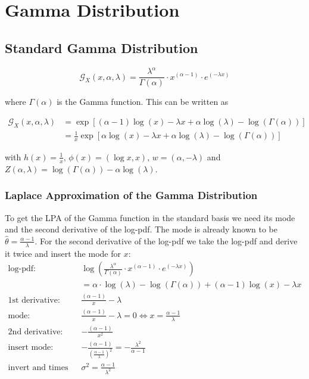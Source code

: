 \section{Gamma Distribution}

\subsection{Standard Gamma Distribution}

\begin{equation}
	\mathcal{G}_X(x, \alpha, \lambda) = \frac{\lambda^\alpha}{\Gamma(\alpha)} \cdot x^{(\alpha - 1)} \cdot e^{(-\lambda x)}
	\label{eq:gamma_pdf}
\end{equation}

where $\Gamma(\alpha)$ is the Gamma function. This can be written as

\begin{align}
	\mathcal{G}_X(x, \alpha, \lambda) &= \exp \left[(\alpha -1)\log(x) - \lambda x + \alpha \log(\lambda) - \log(\Gamma(\alpha))\right] \\
	&= \frac{1}{x} \exp\left[\alpha\log(x) - \lambda x + \alpha \log(\lambda) - \log(\Gamma(\alpha))\right]
	\label{eq:gamma_exp_family}
\end{align}

with $h(x) = \frac{1}{x},\, \phi(x)=(\log x, x),\, w=(\alpha, -\lambda)$ and $Z(\alpha, \lambda) = \log(\Gamma(\alpha)) - \alpha  \log(\lambda)$. 

\subsubsection{Laplace Approximation of the Gamma Distribution}

To get the LPA of the Gamma function in the standard basis we need its mode and the second derivative of the log-pdf. The mode is already known to be $\hat{\theta} = \frac{\alpha -1}{\lambda}$. For the second derivative of the log-pdf we take the log-pdf and derive it twice and insert the mode for $x$:
\begin{align*}
	\text{log-pdf: } &\log\left( \frac{\lambda^\alpha}{\Gamma(\alpha)} \cdot x^{(\alpha - 1)} \cdot e^{(-\lambda x)}\right) \\
	&= \alpha \cdot \log(\lambda) - \log(\Gamma(\alpha)) + (\alpha -1)\log(x) -\lambda x\\
	\text{1st derivative: }& \frac{(\alpha-1)}{x} - \lambda \\
	\text{mode: }&  \frac{(\alpha-1)}{x} - \lambda = 0 \Leftrightarrow x=\frac{\alpha -1}{\lambda}\\
	\text{2nd derivative: }& -\frac{(\alpha-1)}{x^2}\\
	\text{insert mode: }& -\frac{(\alpha-1)}{(\frac{\alpha -1}{\lambda})^2} = -\frac{\lambda^2}{\alpha - 1} \\
	\text{invert and times -1: }&\sigma^2 = \frac{\alpha-1}{\lambda^2}
\end{align*}

